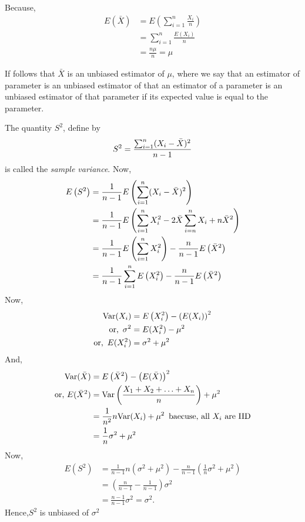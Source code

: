 Because, 
\begin{align*}
	E(\bar{X}) & = E\left( \sum_{i=1}^{n} \frac{X_i}{n} \right) \\ 
	           & = \sum_{i=1}^{n} \frac{E(X_i)}{n}              \\ 
	           & = \frac{n \mu}{n} = \mu
\end{align*}

If follows that $ \bar{X} $ is an unbiased estimator of $ \mu $, where we say that an estimator
of parameter is an unbiased estimator of that an estimator of a parameter is an unbiased estimator
of that parameter if its expected value is equal to the parameter.

The quantity $ S ^{2} $, define by 
\[
    S ^{2} = \frac{\sum_{i=1}^{n}(X_i - \Bar{X})^{2} }{n-1}
\]
is called the \textit{sample variance}.
Now, 
\begin{align*}
    E\left(S^{2} \right) &= \frac{1}{n-1} E\left( \sum_{i = 1}^{n}(X_i - \Bar{X} )^{2}  \right)\\ 
                         &= \frac{1}{n-1} E\left( \sum_{i=1}^{n}X_i^{2} - 2\Bar{X} \sum_{i=n}^{n} X_i + n \Bar{X}^{2}  \right)\\
                         &= \frac{1}{n-1}E\left( \sum_{i=1}^{n}X_i^{2}\right) - \frac{n}{n-1} E\left( \Bar{X}^{2} \right) \\
                         &= \frac{1}{n-1}\sum_{i=1}^{n}E\left( X_i^{2}\right) - \frac{n}{n-1} E\left( \Bar{X}^{2} \right)
\end{align*}
Now,
\begin{align*}
    \text{Var}(X_i) &= E\left( X_i^{2} \right) - \left( E(X_i) \right)^{2} \\
    \text{or, }\, \sigma^{2} &= E(X_i^{2}) - \mu^{2} \\ 
    \text{or, }\, E(X_i^{2}) &= \sigma^{2} + \mu^{2} 
\end{align*}
And,
\begin{align*}
    \text{Var}(\Bar{X}) &= E\left( \Bar{X}^{2} \right) - \left( E(\bar{X}) \right)^{2}\\ 
    \text{or, } E(\bar{X}^{2}) &= \text{Var}\left( \frac{X_1+X_2+\ldots+X_n}{n} \right) + \mu^{2} \\ 
                             &= \frac{1}{n^{2}} n\text{Var}(X_i) + \mu^{2} \, \text{ baecuse, all }X_i\text{ are IID} \\
                            &= \frac{1}{n}\sigma^{2} + \mu^{2}
\end{align*}
Now,
\begin{align*}
    E\left( S^{2} \right) &= \frac{1}{n-1}n\left( \sigma^{2} + \mu^{2} \right) - \frac{n}{n-1}\left( \frac{1}{n}\sigma^{2} + \mu^{2} \right)\\ 
                          &= \left( \frac{n}{n-1} - \frac{1}{n-1} \right)\sigma^{2} \\ 
                          &= \frac{n-1}{n-1}\sigma^{2} = \sigma^{2}.
\end{align*}
Hence,$ S^{2} $ is unbiased of $ \sigma ^{2} $
